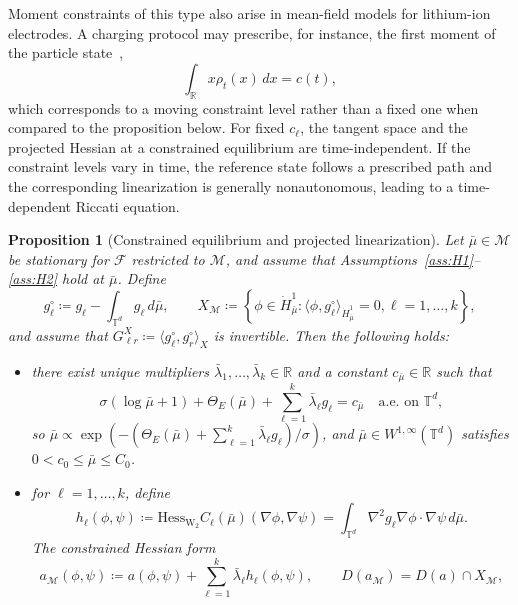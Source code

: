 \documentclass[11pt]{article}
\numberwithin{equation}{section}
\newtheorem{proposition}[theorem]{Proposition}
\theoremstyle{definition}
\newcommand{\R}{\mathbb{R}}
\newcommand{\T}{\mathbb{T}}
\newcommand{\F}{\mathcal{F}}
\newcommand{\Wtwo}{\operatorname{W}_2}
\newcommand{\potential}[1][\mu]{\dot{H}^1_{#1}}
\begin{document}
Moment constraints of this type also arise in mean-field models for lithium-ion electrodes.
A charging protocol may prescribe, for instance, the first moment of the particle state~\cite{DreyerEtAl2010,EberleNiethammerSchlichting2017},
\[
\int_\R x \rho_t(x) \, dx = c(t),
\]
which corresponds to a moving constraint level rather than a fixed one when compared to the proposition below.
For fixed $c_\ell$, the tangent space and the projected Hessian at a constrained equilibrium are time-independent.
If the constraint levels vary in time, the reference state follows a prescribed path and the corresponding linearization is generally nonautonomous, leading to a time-dependent Riccati equation.

\begin{proposition}[Constrained equilibrium and projected linearization]
    \label{prop:constrained_projected_hessian}
    Let $\bar\mu \in \mathcal{M}$ be stationary for $\F$ restricted to $\mathcal{M}$, and assume that Assumptions~\ref{ass:H1}--\ref{ass:H2} hold at $\bar\mu$.
    Define
    \[
    g_\ell^\circ \coloneqq g_\ell - \int_{\T^d} g_\ell \,d\bar\mu, \qquad X_{\mathcal{M}} \coloneqq \left\{\phi \in \potential[\bar\mu] : \langle \phi,g_\ell^\circ\rangle_{\potential[\bar\mu]} = 0, \ell = 1, \ldots, k\right\},
    \]
    and assume that $G^X_{\ell r} \coloneqq \langle g_\ell^\circ, g_r^\circ\rangle_{X}$ is invertible.
    Then the following holds:
    \begin{itemize}
        \item[(i)] there exist unique multipliers $\bar\lambda_1, \ldots, \bar\lambda_k \in \R$ and a constant $c_{\bar\mu} \in \R$ such that
        \begin{equation}
            \label{eq:euler_lagrange_constrained}
            \sigma(\log\bar\mu + 1) + \Theta_E(\bar\mu) + \sum_{\ell=1}^k \bar\lambda_\ell g_\ell = c_{\bar\mu} \quad \text{a.e.\ on } \T^d,
        \end{equation}
        so $\bar\mu \propto \exp \left(-(\Theta_E(\bar\mu) + \sum_{\ell=1}^k \bar\lambda_\ell g_\ell) / \sigma \right)$, and $\bar\mu \in W^{1,\infty}(\T^d)$ satisfies $0 < c_0 \le \bar\mu \le C_0$.
        \item[(ii)] for $\ell = 1, \dots, k$, define 
        \[
        h_\ell(\phi,\psi) \coloneqq \mathrm{Hess}_{\Wtwo} C_\ell(\bar\mu)(\nabla\phi, \nabla\psi) = \int_{\T^d} \nabla^2 g_\ell \nabla \phi \cdot \nabla \psi \, d\bar\mu.
        \]
        The constrained Hessian form
        \[
        a_{\mathcal{M}}(\phi,\psi) \coloneqq a(\phi,\psi) + \sum_{\ell=1}^k \bar\lambda_\ell h_\ell(\phi,\psi), \qquad D(a_{\mathcal{M}}) = D(a) \cap X_{\mathcal{M}},
\]
\end{itemize}
\end{proposition}
\end{document}
